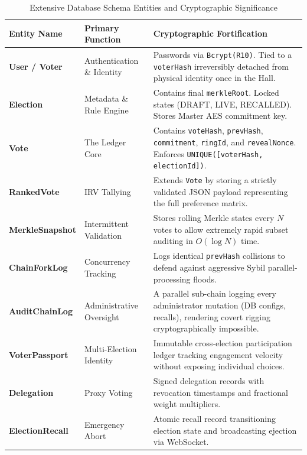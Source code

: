 \documentclass[journal,10pt,twocolumn]{IEEEtran}
\begin{document}
\begin{table}[t]
\caption{Extensive Database Schema Entities and Cryptographic Significance}
\label{tab:schema_full}
\begin{center}
\begin{tabularx}{\linewidth}{|l|l|X|}
\hline
\rowcolor{chainblue!15}
\textbf{Entity Name} & \textbf{Primary Function} & \textbf{Cryptographic Fortification} \\
\hline
\textbf{User / Voter} & Authentication \& Identity & Passwords via \texttt{Bcrypt(R10)}. Tied to a \texttt{voterHash} irreversibly detached from physical identity once in the Hall. \\
\hline
\textbf{Election} & Metadata \& Rule Engine & Contains final \texttt{merkleRoot}. Locked states (DRAFT, LIVE, RECALLED). Stores Master AES commitment key. \\
\hline
\textbf{Vote} & The Ledger Core & Contains \texttt{voteHash}, \texttt{prevHash}, \texttt{commitment}, \texttt{ringId}, and \texttt{revealNonce}. Enforces \texttt{UNIQUE([voterHash, electionId])}. \\
\hline
\textbf{RankedVote} & IRV Tallying & Extends \texttt{Vote} by storing a strictly validated JSON payload representing the full preference matrix. \\
\hline
\textbf{MerkleSnapshot} & Intermittent Validation & Stores rolling Merkle states every $N$ votes to allow extremely rapid subset auditing in $O(\log N)$ time. \\
\hline
\textbf{ChainForkLog} & Concurrency Tracking & Logs identical \texttt{prevHash} collisions to defend against aggressive Sybil parallel-processing floods. \\
\hline
\textbf{AuditChainLog} & Administrative Oversight & A parallel sub-chain logging every administrator mutation (DB configs, recalls), rendering covert rigging cryptographically impossible. \\
\hline
\textbf{VoterPassport} & Multi-Election Identity & Immutable cross-election participation ledger tracking engagement velocity without exposing individual choices. \\
\hline
\textbf{Delegation} & Proxy Voting & Signed delegation records with revocation timestamps and fractional weight multipliers. \\
\hline
\textbf{ElectionRecall} & Emergency Abort & Atomic recall record transitioning election state and broadcasting ejection via WebSocket. \\
\hline
\end{tabularx}
\end{center}
\end{table}
\end{document}
